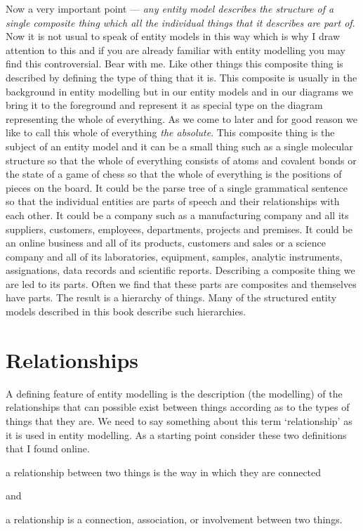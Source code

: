 \mynote
Now a very  important point ---
\textit{any entity model describes the structure of a single composite thing which all the individual things that it describes are part of}. Now it is not usual to speak of entity models in this way which is why I draw attention to this and if you are already familiar with entity modelling you may find this controversial. Bear with me.
\mynote
Like other things this composite thing is described by defining the type of thing that it is. This composite is usually in the background in entity modelling but in our entity models and in our diagrams we bring it to the foreground and represent it as special type on the diagram representing the whole of everything. As we come to later and for good reason we like to call this whole of everything \textit{the absolute}.   This composite thing  is the subject of an entity model and it can be a small thing such as a single molecular structure so that the whole of everything consists of atoms and covalent bonds or the state of a game of chess so that the whole of everything is the positions of pieces on the board. It could be the parse tree of a single grammatical sentence so that the individual entities are parts of speech and their relationships with each other. It could be a company such as a manufacturing company and all its suppliers, customers, employees, departments, projects and premises. 
It could be an online business and all of its products, customers and sales or
a science company and all of its laboratories, equipment, samples, analytic instruments, assignations, data records and  scientific reports. 
\mynote
Describing a composite thing we are led to its parts. Often we find that these parts are composites and themselves have parts. The result is a hierarchy of things. Many of the structured entity models described in this book describe such hierarchies. 

\section{Relationships}
\mynote
A defining feature of entity modelling is the description
 (the modelling) of the relationships that can possible  exist between things according as to the types of things that they are. 
\mynote 
We need to say something about this term `relationship' as it is used in
entity modelling.
As a starting point consider these two definitions that I found online. 

\begin{erquote}
a relationship between two things is the way in which they are connected
\end{erquote}
and 
\begin{erquote}
a relationship is a connection, association, or involvement between two things.
\end{erquote}

